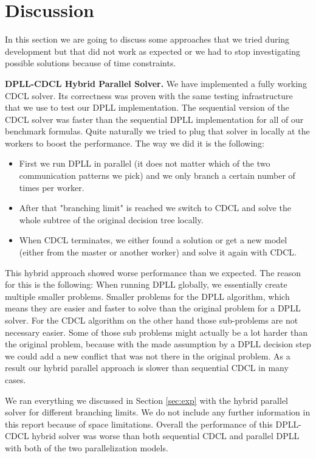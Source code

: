 \documentclass[letterpaper]{article}
\newcommand{\mypar}[1]{{\bf #1.}}
\begin{document}
\section{Discussion}\label{sec:discussion}
In this section we are going to discuss some approaches that we tried during development but that did not work as expected or we had to stop investigating possible solutions because of time constraints.

\mypar{DPLL-CDCL Hybrid Parallel Solver}
We have implemented a fully working CDCL solver.
Its correctness was proven with the same testing infrastructure that we use to test our DPLL implementation.
The sequential version of the CDCL solver was faster than the sequential DPLL implementation for all of our benchmark formulas.
Quite naturally we tried to plug that solver in locally at the workers to boost the performance.
The way we did it is the following:
\begin{itemize}
    \item First we run DPLL in parallel (it does not matter which of the two communication patterns we pick) and we only branch a certain number of times per worker.
    \item After that "branching limit" is reached we switch to CDCL and solve the whole subtree of the original decision tree locally.
    \item When CDCL terminates, we either found a solution or get a new model (either from the master or another worker) and solve it again with CDCL.
\end{itemize}
This hybrid approach showed worse performance than we expected.
The reason for this is the following:
When running DPLL globally, we essentially create multiple smaller problems.
Smaller problems for the DPLL algorithm, which means they are easier and faster to solve than the original problem for a DPLL solver.
For the CDCL algorithm on the other hand those sub-problems are not necessary easier.
Some of those sub problems might actually be a lot harder than the original problem,
because with the made assumption by a DPLL decision step we could add a new conflict that was not there in the original problem.
As a result our hybrid parallel approach is slower than sequential CDCL in many cases.

We ran everything we discussed in Section \ref{sec:exp} with the hybrid parallel solver for different branching limits.
We do not include any further information in this report because of space limitations.
Overall the performance of this DPLL-CDCL hybrid solver was worse than both sequential CDCL and parallel DPLL with both of the two parallelization models.
\end{document}
